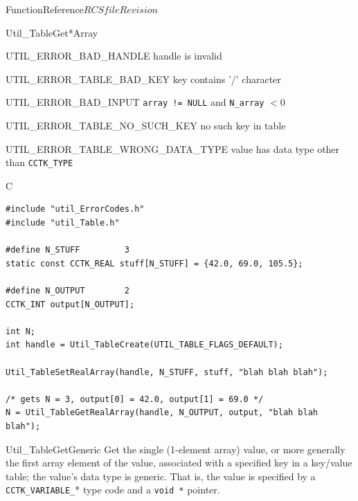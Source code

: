 \begin{cactuspart}{FunctionReference}{$RCSfile$}{$Revision$}
\begin{FunctionDescription}{Util\_TableGet*Array}
\begin{ErrorSection}
\begin{Error}{UTIL\_ERROR\_BAD\_HANDLE}
handle is invalid
\end{Error}
\begin{Error}{UTIL\_ERROR\_TABLE\_BAD\_KEY}
key contains '/' character
\end{Error}
\begin{Error}{UTIL\_ERROR\_BAD\_INPUT}
\verb|array != NULL| and \verb|N_array| $< 0$
\end{Error}
\begin{Error}{UTIL\_ERROR\_TABLE\_NO\_SUCH\_KEY}
no such key in table
\end{Error}
\begin{Error}{UTIL\_ERROR\_TABLE\_WRONG\_DATA\_TYPE}
value has data type other than \verb|CCTK_TYPE|
\end{Error}
\end{ErrorSection}

\begin{ExampleSection}
\begin{Example}{C}
\begin{verbatim}
#include "util_ErrorCodes.h"
#include "util_Table.h"

#define N_STUFF         3
static const CCTK_REAL stuff[N_STUFF] = {42.0, 69.0, 105.5};

#define N_OUTPUT        2
CCTK_INT output[N_OUTPUT];

int N;
int handle = Util_TableCreate(UTIL_TABLE_FLAGS_DEFAULT);

Util_TableSetRealArray(handle, N_STUFF, stuff, "blah blah blah");

/* gets N = 3, output[0] = 42.0, output[1] = 69.0 */
N = Util_TableGetRealArray(handle, N_OUTPUT, output, "blah blah blah");
\end{verbatim}
\end{Example}
\end{ExampleSection}
\end{FunctionDescription}


\begin{FunctionDescription}{Util\_TableGetGeneric}
\label{Util-TableGetGeneric}
Get the single (1-element array) value, or more generally the
first array element of the value, associated with a specified key
in a key/value table; the value's data type is generic.  That
is, the value is specified by a \verb|CCTK_VARIABLE_|* type code
and a \verb|void *| pointer.


\end{FunctionDescription}
\end{cactuspart}

